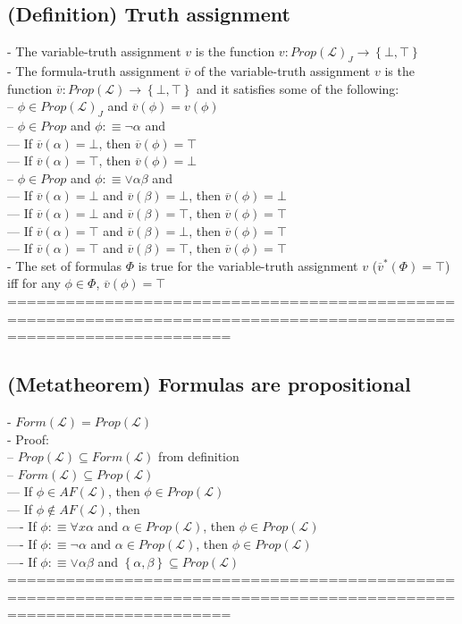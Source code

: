 \documentclass{book}
\newcommand{\is}{:\equiv}
\newcommand{\inot}{\not}
\newcommand{\extend}[1]{\overline{#1}}
\newcommand{\set}[1]{\left\{ #1 \right\}}
\begin{document}
\subsection{(Definition) Truth assignment} %
	- The variable-truth assignment $v$ is the function $v: Prop(\mathcal{L})_J \rightarrow \set{\bot, \top}$ \\
	- The formula-truth assignment $\extend{v}$ of the variable-truth assignment $v$ is the function $\extend{v}: Prop(\mathcal{L}) \rightarrow \set{\bot, \top}$ and it satisfies some of the following: \\
		-- $\phi \in Prop(\mathcal{L})_J$ and $\extend{v}(\phi) = v(\phi)$ \\
		-- $\phi \in Prop$ and $\phi \is \lnot \alpha$ and \\
			--- If $\extend{v}(\alpha) = \bot$, then $\extend{v}(\phi) = \top$ \\
			--- If $\extend{v}(\alpha) = \top$, then $\extend{v}(\phi) = \bot$ \\
		-- $\phi \in Prop$ and $\phi \is \lor \alpha \beta$ and \\
			--- If $\extend{v}(\alpha) = \bot$ and $\extend{v}(\beta) = \bot$, then $\extend{v}(\phi) = \bot$ \\
			--- If $\extend{v}(\alpha) = \bot$ and $\extend{v}(\beta) = \top$, then $\extend{v}(\phi) = \top$ \\
			--- If $\extend{v}(\alpha) = \top$ and $\extend{v}(\beta) = \bot$, then $\extend{v}(\phi) = \top$ \\
			--- If $\extend{v}(\alpha) = \top$ and $\extend{v}(\beta) = \top$, then $\extend{v}(\phi) = \top$ \\
	- The set of formulas $\Phi$ is true for the variable-truth assignment $v$ ($\extend{v}^*(\Phi) = \top$) iff for any $\phi \in \Phi$, $\extend{v}(\phi) = \top$ \\
	===================================================================================================================
\subsection{(Metatheorem) Formulas are propositional} %
	- $Form(\mathcal{L}) = Prop(\mathcal{L})$ \\
	- Proof: \\
		-- $Prop(\mathcal{L}) \subseteq Form(\mathcal{L})$ from definition \\
		-- $Form(\mathcal{L}) \subseteq Prop(\mathcal{L})$ \\
			--- If $\phi \in AF(\mathcal{L})$, then $\phi \in Prop(\mathcal{L})$ \\
			--- If $\phi \inot \in AF(\mathcal{L})$, then \\
				---- If $\phi \is \forall x \alpha$ and $\alpha \in Prop(\mathcal{L})$, then $\phi \in Prop(\mathcal{L})$ \\
				---- If $\phi \is \lnot \alpha$ and $\alpha \in Prop(\mathcal{L})$, then $\phi \in Prop(\mathcal{L})$ \\
				---- If $\phi \is \lor \alpha \beta$ and $\set{\alpha, \beta} \subseteq Prop(\mathcal{L})$ \\
	===================================================================================================================
\end{document}
